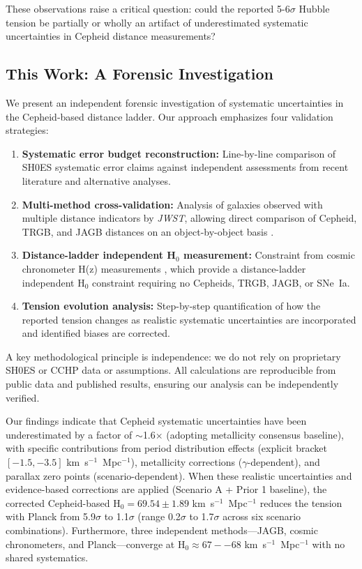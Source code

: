 \documentclass[preprint, linenumbers]{aastex701}
\begin{document}
These observations raise a critical question: could the reported 5-6$\sigma$ Hubble tension be partially or wholly an artifact of underestimated systematic uncertainties in Cepheid distance measurements?

\subsection{This Work: A Forensic Investigation}

We present an independent forensic investigation of systematic uncertainties in the Cepheid-based distance ladder. Our approach emphasizes four validation strategies:

\begin{enumerate}
\item \textbf{Systematic error budget reconstruction:} Line-by-line comparison of SH0ES systematic error claims against independent assessments from recent literature and alternative analyses.

\item \textbf{Multi-method cross-validation:} Analysis of galaxies observed with multiple distance indicators by \textit{JWST}, allowing direct comparison of Cepheid, TRGB, and JAGB distances on an object-by-object basis \citep{Freedman2025a}.

\item \textbf{Distance-ladder independent H$_0$ measurement:} Constraint from cosmic chronometer H(z) measurements \citep{Moresco2022}, which provide a distance-ladder independent H$_0$ constraint requiring no Cepheids, TRGB, JAGB, or SNe~Ia.

\item \textbf{Tension evolution analysis:} Step-by-step quantification of how the reported tension changes as realistic systematic uncertainties are incorporated and identified biases are corrected.
\end{enumerate}

A key methodological principle is independence: we do not rely on proprietary SH0ES or CCHP data or assumptions. All calculations are reproducible from public data and published results, ensuring our analysis can be independently verified.

Our findings indicate that Cepheid systematic uncertainties have been underestimated by a factor of $\sim$1.6$\times$ (adopting metallicity consensus baseline), with specific contributions from period distribution effects (explicit bracket $[-1.5, -3.5]$ km~s$^{-1}$~Mpc$^{-1}$), metallicity corrections ($\gamma$-dependent), and parallax zero points (scenario-dependent). When these realistic uncertainties and evidence-based corrections are applied (Scenario A + Prior 1 baseline), the corrected Cepheid-based H$_0 = 69.54 \pm 1.89$ km~s$^{-1}$~Mpc$^{-1}$ reduces the tension with Planck from 5.9$\sigma$ to 1.1$\sigma$ (range 0.2$\sigma$ to 1.7$\sigma$ across six scenario combinations). Furthermore, three independent methods---JAGB, cosmic chronometers, and Planck---converge at H$_0 \approx 67--68$ km~s$^{-1}$~Mpc$^{-1}$ with no shared systematics.
\end{document}
